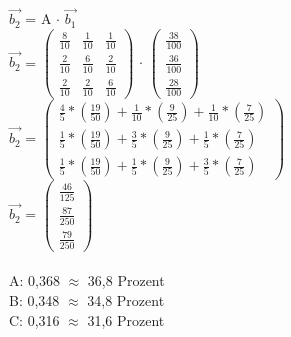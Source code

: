 \documentclass{article}
\begin{document}
	$\vec{b_{2}}$ = A $\cdot$ $\vec{b_{1}}$ \\
	$\vec{b_{2}}$ =
	$\left(\begin{array}{ccc}
	\frac{8}{10} & \frac{1}{10} & \frac{1}{10} \\ \frac{2}{10} & \frac{6}{10} & \frac{2}{10} \\ \frac{2}{10} & \frac{2}{10} &\frac{6}{10}
	\end{array}\right)$ 
	$\cdot$
	$\left(\begin{array}{c}
	\frac{38}{100} \\ \frac{36}{100} \\ \frac{28}{100}
	\end{array}\right)$ \\
	$\vec{b_{2}}$ = 
	$
	\left(\begin{matrix}
	\frac{4}{5}*\left(\frac{19}{50}\right)+\frac{1}{10}*\left(\frac{9}{25}\right)+\frac{1}{10}*\left(\frac{7}{25}\right) \\
	\frac{1}{5}*\left(\frac{19}{50}\right)+\frac{3}{5}*\left(\frac{9}{25}\right)+\frac{1}{5}*\left(\frac{7}{25}\right) \\
	\frac{1}{5}*\left(\frac{19}{50}\right)+\frac{1}{5}*\left(\frac{9}{25}\right)+\frac{3}{5}*\left(\frac{7}{25}\right)
	\end{matrix}\right)
	$ \\
	$\vec{b_{2}}$ = 
	$
	\left(\begin{matrix}
	\frac{46}{125} \\
	\frac{87}{250} \\
	\frac{79}{250}
	\end{matrix}\right)
	$ \\ \\
	A: 0,368 $\approx$ 36,8 Prozent \\
	B: 0,348 $\approx$ 34,8 Prozent \\
	C: 0,316 $\approx$ 31,6 Prozent
\end{document}
